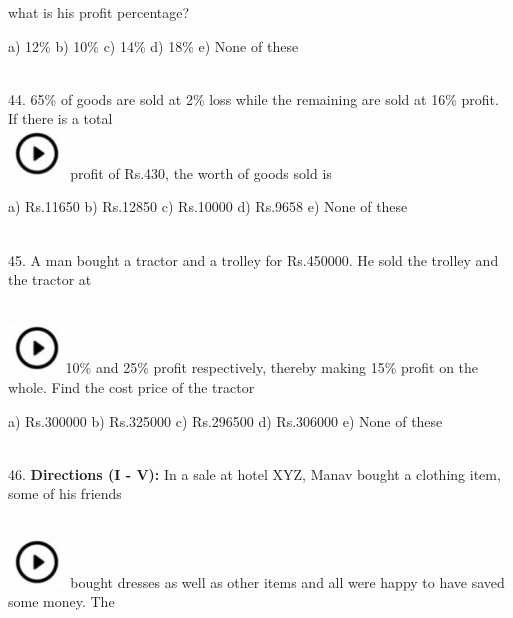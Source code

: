\documentclass{article} %
\begin{document}
\noindent what is his profit percentage?

\noindent 

\noindent a) 12\%                    b) 10\%              c) 14\%              d) 18\%              e) None of these

\noindent 

\noindent 

\noindent  \\ 

44. 65\% of goods are sold at 2\% loss while the remaining are sold at 16\% profit. If there is a total  
\noindent \\ \includegraphics*[width=0.60in, height=0.52in]{images/image1} profit of Rs.430, the worth of goods sold is

\noindent a) Rs.11650             b) Rs.12850      c) Rs.10000      d) Rs.9658        e) None of these

\noindent 

\noindent 

\noindent 

\noindent \\  45. A man bought a tractor and a trolley for Rs.450000. He sold the trolley and the tractor at

\noindent 

\noindent  
\noindent \\ \includegraphics*[width=0.60in, height=0.52in]{images/image1}10\% and 25\% profit respectively, thereby making 15\% profit on the whole. Find the cost price of the tractor

\noindent 

\noindent a) Rs.300000           b) Rs.325000    c) Rs.296500    d) Rs.306000    e) None of these

\noindent 

\noindent  \\ 

46. \textbf{Directions (I - V): }In a sale at hotel XYZ, Manav bought a clothing item, some of his friends 
 
\noindent \\ \includegraphics*[width=0.60in, height=0.52in]{images/image1} bought dresses as well as other items and all were happy to have saved some money. The
\end{document}
